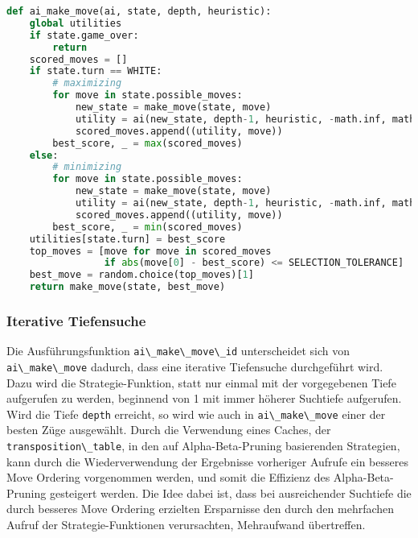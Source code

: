 \begin{lstlisting}[language=Python]
def ai_make_move(ai, state, depth, heuristic):
    global utilities
    if state.game_over:
        return
    scored_moves = []
    if state.turn == WHITE:
        # maximizing
        for move in state.possible_moves:
            new_state = make_move(state, move)
            utility = ai(new_state, depth-1, heuristic, -math.inf, math.inf)
            scored_moves.append((utility, move))
        best_score, _ = max(scored_moves)
    else:
        # minimizing
        for move in state.possible_moves:
            new_state = make_move(state, move)
            utility = ai(new_state, depth-1, heuristic, -math.inf, math.inf)
            scored_moves.append((utility, move))
        best_score, _ = min(scored_moves)
    utilities[state.turn] = best_score
    top_moves = [move for move in scored_moves
                 if abs(move[0] - best_score) <= SELECTION_TOLERANCE]
    best_move = random.choice(top_moves)[1]
    return make_move(state, best_move)
\end{lstlisting}

\hypertarget{iterative-tiefensuche}{%
\subsubsection{Iterative Tiefensuche}\label{iterative-tiefensuche}}

Die Ausführungsfunktion \passthrough{\lstinline!ai\_make\_move\_id!}
unterscheidet sich von \passthrough{\lstinline!ai\_make\_move!} dadurch,
dass eine iterative Tiefensuche durchgeführt wird. Dazu wird die
Strategie-Funktion, statt nur einmal mit der vorgegebenen Tiefe
aufgerufen zu werden, beginnend von 1 mit immer höherer Suchtiefe
aufgerufen. Wird die Tiefe \passthrough{\lstinline!depth!} erreicht, so
wird wie auch in \passthrough{\lstinline!ai\_make\_move!} einer der
besten Züge ausgewählt. Durch die Verwendung eines Caches, der
\passthrough{\lstinline!transposition\_table!}, in den auf
Alpha-Beta-Pruning basierenden Strategien, kann durch die
Wiederverwendung der Ergebnisse vorheriger Aufrufe ein besseres Move
Ordering vorgenommen werden, und somit die Effizienz des
Alpha-Beta-Pruning gesteigert werden. Die Idee dabei ist, dass bei
ausreichender Suchtiefe die durch besseres Move Ordering erzielten
Ersparnisse den durch den mehrfachen Aufruf der Strategie-Funktionen
verursachten, Mehraufwand übertreffen.

